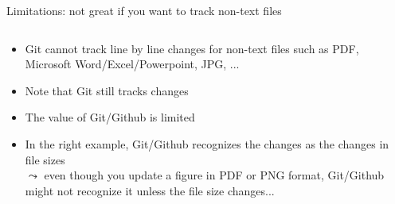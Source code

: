 \documentclass[handout,pdftex,10pt,aspectratio=169]{beamer}
\begin{document}
\begin{frame}[fragile]{Limitations: not great if you want to track non-text files}
  \begin{columns}[c]
    \begin{column}{0.46\linewidth}
      \begin{itemize}[<+->]\setlength\itemsep{10pt}
        \item Git cannot track line by line changes for non-text files such as 
        PDF, Microsoft Word/Excel/Powerpoint, JPG, ...
        \item Note that Git still tracks changes
        \item The value of Git/Github is limited
        \medskip
        \item In the right example, Git/Github recognizes the changes as the changes in file sizes\\
        $\leadsto$ even though you update a figure in PDF or PNG format, 
        Git/Github might not recognize it unless the file size changes...
      \end{itemize}
    \end{column} \hfill
    \begin{column}{0.53\linewidth}
      \centering
    \end{column}
  \end{columns}
\end{frame}
\end{document}
